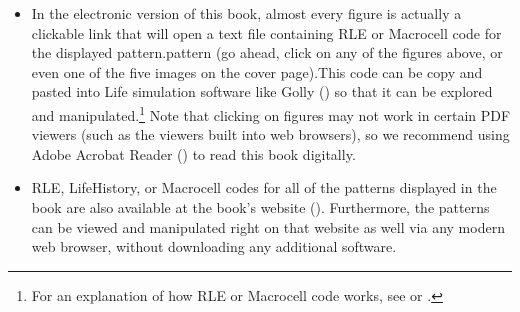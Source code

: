 \begin{itemize}
	\noindent\begin{minipage}{\linewidth}
		\centering
		\begin{minipage}[b]{0.56\textwidth}
			\centering
			\label{fig:preface_p15_gun}
		\end{minipage}\hfill
		\begin{minipage}[b]{0.4\textwidth}
			\centering
			\label{fig:preface_fx77_p5_eat}
		\end{minipage}\bigskip
	\end{minipage}
	
	\item In the electronic version of this book, almost every figure is actually a clickable link that will open a text file containing RLE or Macrocell code for the displayed \ifdefined\FORPRINTING pattern.\else pattern (go ahead, click on any of the figures above, or even one of the five images on the cover page).\fi This code can be copy and pasted into Life simulation software like Golly () so that it can be explored and manipulated.\footnote{For an explanation of how RLE or Macrocell code works, see  or .} Note that clicking on figures may not work in certain PDF viewers (such as the viewers built into web browsers), so we recommend using Adobe Acrobat Reader () to read this book digitally.\smallskip
	
	\item RLE, LifeHistory, or Macrocell codes for all of the patterns displayed in the book are also available at the book's website (). Furthermore, the patterns can be viewed and manipulated right on that website as well via any modern web browser, without downloading any additional software.\medskip
\end{itemize}


